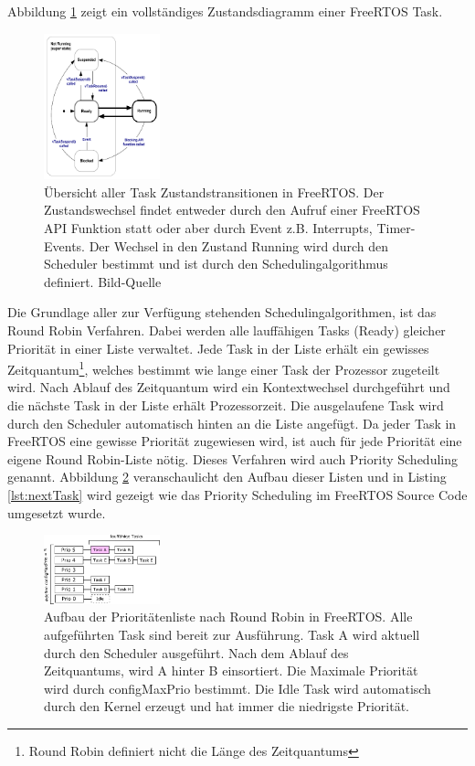  Abbildung \ref{fig:TaskStates} zeigt ein vollständiges Zustandsdiagramm einer FreeRTOS Task. 
\begin{figure}[ht!]
	\centering
		\includegraphics[width=0.3\textwidth]{Pictures/FreeRTOSOrg/taskStates.png}
	\caption{Übersicht aller Task Zustandstransitionen in FreeRTOS. Der Zustandswechsel findet entweder durch den Aufruf einer FreeRTOS API Funktion statt oder aber durch Event z.B. Interrupts, Timer-Events. Der Wechsel in den Zustand Running wird durch den Scheduler bestimmt und ist durch den Schedulingalgorithmus definiert.  Bild-Quelle~\protect{}}
	\label{fig:TaskStates}
\end{figure} 
\newline
Die Grundlage aller zur Verfügung stehenden Schedulingalgorithmen, ist das Round Robin Verfahren\cite{9783827373427}. Dabei werden alle lauf\-fäh\-igen Tasks (Ready) gleicher Priorität in einer Liste verwaltet. Jede Task in der Liste erhält ein gewisses Zeitquantum\footnote{Round Robin definiert nicht die Länge des Zeitquantums}, welches bestimmt wie lange einer Task der Prozessor zugeteilt wird. Nach Ablauf des Zeitquantum wird ein Kontextwechsel durchgeführt und die näch\-ste Task in der Liste erhält Prozessorzeit. Die ausgelaufene Task wird durch den Scheduler automatisch hinten an die Liste angefügt. Da jeder Task in FreeRTOS eine gewisse Priorität zugewiesen wird, ist auch für jede Priorität eine eigene Round Robin-Liste nötig. Dieses Verfahren wird auch Priority Scheduling \cite{9783827373427} genannt. Abbildung \ref{fig:PrioList1} veranschaulicht den Aufbau dieser Listen und in Listing \ref{lst:nextTask} wird gezeigt wie das Priority Scheduling im FreeRTOS Source Code umgesetzt wurde. 
\begin{figure}[ht!]
	\centering
		\includegraphics[width=0.3\textwidth]{Pictures/Scheduling/PrioList1.png}
	\caption{Aufbau der Prioritätenliste nach Round Robin in FreeRTOS. Alle aufgeführten Task sind bereit zur Ausführung. Task A wird aktuell durch den Scheduler ausgeführt. Nach dem Ablauf des Zeitquantums, wird A hinter B einsortiert. Die Maximale Priorität wird durch configMaxPrio bestimmt. Die Idle Task wird automatisch durch den Kernel erzeugt und hat immer die niedrigste Priorität. }
	\label{fig:PrioList1}
\end{figure}
